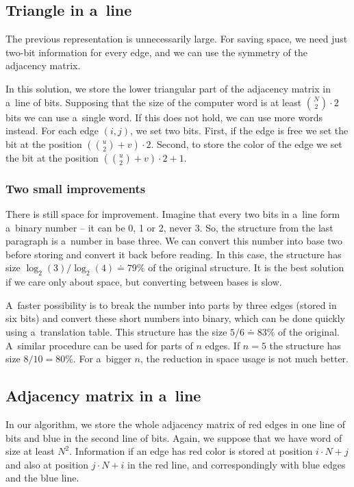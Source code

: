 \subsection{Triangle in a~line}

The previous representation is unnecessarily large. For saving space, we need just
two-bit information for every edge, and we can use the symmetry of the adjacency
matrix. 

In this solution, we store the lower triangular part of the adjacency matrix in a~line of
bits. Supposing that the size of the computer word is at least ${N
\choose 2} \cdot 2$ bits we can use a~single word. If this does not hold, we can use more
words instead. For each edge $(i,j)$, we set two bits. First, if the edge is free
we set the bit at the position $({u \choose 2}+v)\cdot2$. Second, to store the color of
the edge we set the bit at the position $({u \choose 2}+v)\cdot2+1$.

\subsubsection{Two small improvements}

There is still space for improvement. Imagine that every two bits in a~line form
a~binary number -- it can be 0, 1 or 2, never 3. So, the structure from the last
paragraph is a~number in base three. We can convert this number into base two
before storing and convert it back before reading. In this case, the structure has
size $ \log_2(3)/\log_2(4) \doteq 79\% $ of the original structure. It is the best solution if we care
only about space, but converting between bases is slow.

A~faster possibility is to break the number into parts by three edges (stored
in six bits) and convert these short numbers into binary, which can be done
quickly using a~translation table. This structure has the size $5/6 \doteq 83\%
$ of the original. A~similar procedure can be used for parts of $n$ edges. If
$n=5$ the structure has size $8/10=80\%$. For a~bigger $n$, the reduction in space
usage is not much better.

\subsection{Adjacency matrix in a~line}

In our algorithm, we store the whole adjacency matrix of red edges in one line of bits and blue 
in the second line of bits. Again, we suppose that we have word of size at least
$N^2$. Information if an edge has red color is stored at position $i \cdot N+j$ and
also at position $j \cdot N+i$ in the red line, and correspondingly with blue edges and
the blue line.

